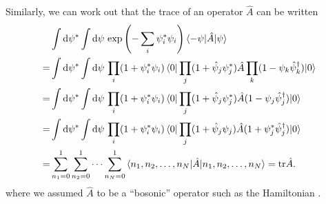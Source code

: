 Similarly, we can work out that the trace of an operator $\hat{A}$ can be written
\begin{equation}
\begin{split}
	 & \int \dif \conj{\psi} \int \dif \psi \, \exp \left( -\sum_i \conj{\psi}_i \psi_i \right) \braket{-\psi | \hat{A} | \psi} \\
	=& \int \dif \conj{\psi} \int \dif \psi \, \prod_i (1 + \conj\psi_i \psi_i) \braket{0 | \prod_j (1 + \destr_j \conj\psi_j) \hat{A} \prod_k (1 - \psi_k \creat_k) | 0} \\
	=& \int \dif \conj{\psi} \int \dif \psi \, \prod_i (1 + \conj\psi_i \psi_i) \braket{0 | \prod_j (1 + \destr_j \conj\psi_j) \hat{A} (1 - \psi_j \creat_j) | 0} \\
	=& \int \dif \conj{\psi} \int \dif \psi \, \prod_i (1 + \conj\psi_i \psi_i) \braket{0 | \prod_j (1 + \destr_j \psi_j) \hat{A} (1 + \conj\psi_j \creat_j) | 0} \\
	=& \sum_{n_1=0}^1 \sum_{n_2=0}^1\cdots \sum_{n_N=0}^1 \braket{n_1, n_2, \ldots, n_N | \hat{A} | n_1, n_2, \ldots, n_N} = \trace{\hat{A}} . \\
\end{split}
\end{equation}
where we assumed $\hat{A}$ to be a ``bosonic'' operator such as the Hamiltonian .

